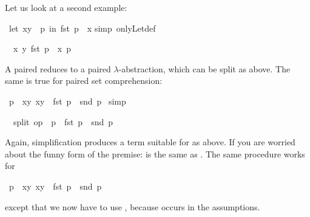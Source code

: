 \begin{isabellebody}
\begin{isamarkuptxt}
Let us look at a second example:%
\end{isamarkuptxt}%
\ {\isachardoublequote}let\ {\isacharparenleft}x{\isacharcomma}y{\isacharparenright}\ {\isacharequal}\ p\ in\ fst\ p\ {\isacharequal}\ x{\isachardoublequote}\isanewline
{}simp\ only{\isacharcolon}Let{\isacharunderscore}def{\isacharparenright}%
\begin{isamarkuptxt}%
\begin{isabelle}%
\ {}{\isachardot}\ {\isacharparenleft}{\isasymlambda}{\isacharparenleft}x{\isacharcomma}\ y{\isacharparenright}{\isachardot}\ fst\ p\ {\isacharequal}\ x{\isacharparenright}\ p%
\end{isabelle}
A paired  reduces to a paired $\lambda$-abstraction, which
can be split as above. The same is true for paired set comprehension:%
\end{isamarkuptxt}%
\ {\isachardoublequote}p\ {\isasymin}\ {\isacharbraceleft}{\isacharparenleft}x{\isacharcomma}y{\isacharparenright}{\isachardot}\ x{\isacharequal}y{\isacharbraceright}\ {\isasymlongrightarrow}\ fst\ p\ {\isacharequal}\ snd\ p{\isachardoublequote}\isanewline
{}\ simp%
\begin{isamarkuptxt}%
\begin{isabelle}%
\ {}{\isachardot}\ split\ op\ {\isacharequal}\ p\ {\isasymlongrightarrow}\ fst\ p\ {\isacharequal}\ snd\ p%
\end{isabelle}
Again, simplification produces a term suitable for 
as above. If you are worried about the funny form of the premise:
 is the same as .
The same procedure works for%
\end{isamarkuptxt}%
\ {\isachardoublequote}p\ {\isasymin}\ {\isacharbraceleft}{\isacharparenleft}x{\isacharcomma}y{\isacharparenright}{\isachardot}\ x{\isacharequal}y{\isacharbraceright}\ {\isasymLongrightarrow}\ fst\ p\ {\isacharequal}\ snd\ p{\isachardoublequote}%
\begin{isamarkuptxt}%
\noindent
except that we now have to use , because
 occurs in the assumptions.


\end{isamarkuptxt}
\end{isabellebody}
